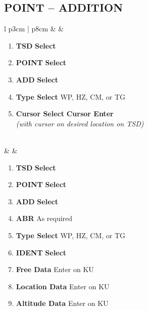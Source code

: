 \documentclass[fontHelvetica]{TechCheck}
\begin{document}
	\subsection{POINT -- ADDITION}
	\begin{center}
		\begin{longtable}{l p{3cm} | p{8cm}}
			\toprule
			\textbf{\textbullet} &  &
			\begin{minipage}[t]{\linewidth}
				\vspace{-7pt}
				\begin{enumerate}
					\item \textbf{TSD} \dotfill \textbf{Select}
					\item \textbf{POINT} \dotfill \textbf{Select}
					\item \textbf{ADD} \dotfill \textbf{Select}
					\item \textbf{Type Select} \dotfill WP, HZ, CM, or TG 
					\item \textbf{Cursor Select} \dotfill \textbf{Cursor Enter} \\
					\hfill \emph{(with cursor on desired location on TSD)}
				\end{enumerate}
			\end{minipage} \\
			\midrule
			\textbf{\textbullet} &  &
			\begin{minipage}[t]{\linewidth}
				\vspace{-7pt}
				\begin{enumerate}
					\item \textbf{TSD} \dotfill \textbf{Select}
					\item \textbf{POINT} \dotfill \textbf{Select}
					\item \textbf{ADD} \dotfill \textbf{Select}
					\item \textbf{ABR} \dotfill As required
					\item \textbf{Type Select} \dotfill WP, HZ, CM, or TG 
					\item \textbf{IDENT} \dotfill \textbf{Select}
					\item \textbf{Free Data} \dotfill Enter on KU
					\item \textbf{Location Data} \dotfill Enter on KU
					\item \textbf{Altitude Data} \dotfill Enter on KU
				\end{enumerate}
			\end{minipage} \\
			\bottomrule
		\end{longtable}
	\end{center}
\end{document}

